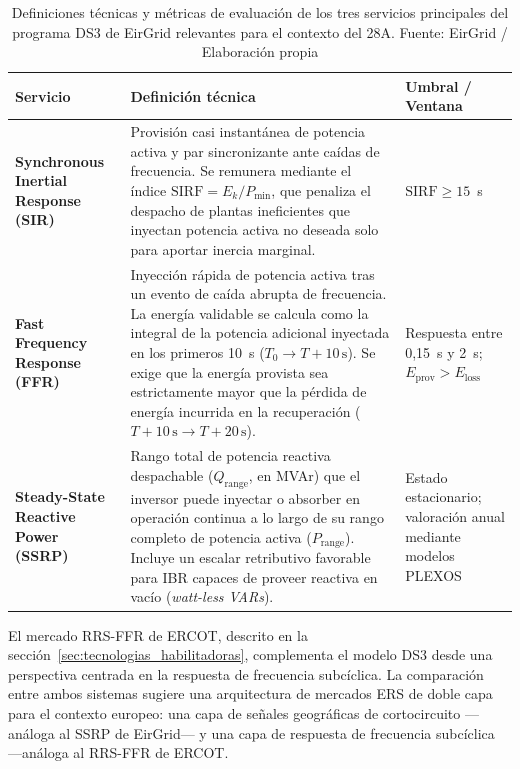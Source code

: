 \begin{table}[H]
\centering
\caption[Definiciones técnicas del programa DS3 de EirGrid.]{%
Definiciones técnicas y métricas de evaluación de los tres servicios
principales del programa DS3 de EirGrid relevantes para el contexto del
28A. Fuente: EirGrid / Elaboración propia}
\label{tab:eirgrid_ds3}
\vspace{0.3cm}
\small
\begin{tabularx}{\textwidth}{>{\bfseries}p{3.2cm} X
                             >{\centering\arraybackslash}p{4.5cm}}
\toprule
\textbf{Servicio} & \textbf{Definición técnica}
                  & \textbf{Umbral / Ventana} \\
\midrule
Synchronous Inertial Response (SIR)
    & Provisión casi instantánea de potencia activa y par sincronizante
      ante caídas de frecuencia. Se remunera mediante el índice
      $\mathrm{SIRF} = E_k / P_\mathrm{min}$, que penaliza el despacho
      de plantas ineficientes que inyectan potencia activa no deseada
      solo para aportar inercia marginal.
    & $\mathrm{SIRF} \geq 15$~s \\
\addlinespace
Fast Frequency Response (FFR)
    & Inyección rápida de potencia activa tras un evento de caída
      abrupta de frecuencia. La energía validable se calcula como la
      integral de la potencia adicional inyectada en los primeros 10~s
      ($T_0 \to T{+}10\,\mathrm{s}$). Se exige que la energía provista
      sea estrictamente mayor que la pérdida de energía incurrida en la
      recuperación ($T{+}10\,\mathrm{s} \to T{+}20\,\mathrm{s}$).
    & Respuesta entre 0{,}15~s y 2~s;
      $E_{\mathrm{prov}} > E_{\mathrm{loss}}$ \\
\addlinespace
Steady-State Reactive Power (SSRP)
    & Rango total de potencia reactiva despachable ($Q_{\mathrm{range}}$,
      en MVAr) que el inversor puede inyectar o absorber en operación
      continua a lo largo de su rango completo de potencia activa
      ($P_{\mathrm{range}}$). Incluye un escalar retributivo favorable
      para IBR capaces de proveer reactiva en vacío
      (\textit{watt-less VARs}).
    & Estado estacionario; valoración anual mediante modelos PLEXOS \\
\bottomrule
\end{tabularx}
\end{table}

El mercado RRS-FFR de ERCOT, descrito en la
sección~\ref{sec:tecnologias_habilitadoras}, complementa el modelo DS3
desde una perspectiva centrada en la respuesta de frecuencia subcíclica.
La comparación entre ambos sistemas sugiere una arquitectura de mercados
ERS de doble capa para el contexto europeo: una capa de señales
geográficas de cortocircuito ---análoga al SSRP de EirGrid--- y una capa
de respuesta de frecuencia subcíclica ---análoga al RRS-FFR de ERCOT.

